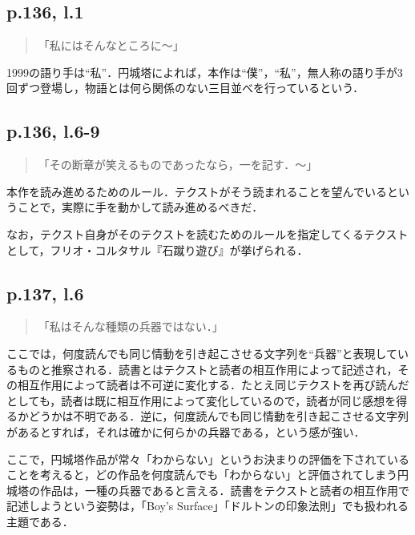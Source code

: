 \documentclass[10pt, a5paper, twoside]{ltjsarticle}
\begin{document}
        \subsection{p.136, l.1}

            \begin{quote}
                「私にはそんなところに〜」
            \end{quote}

            1999の語り手は“私”．円城塔によれば，本作は“僕”，“私”，無人称の語り手が3回ずつ登場し，物語とは何ら関係のない三目並べを行っているという\cite{sri}．

        \subsection{p.136, l.6-9}

            \begin{quote}
                「その断章が笑えるものであったなら，一を記す．〜」
            \end{quote}

            本作を読み進めるためのルール．テクストがそう読まれることを望んでいるということで，実際に手を動かして読み進めるべきだ．

            なお，テクスト自身がそのテクストを読むためのルールを指定してくるテクストとして，フリオ・コルタサル『石蹴り遊び』が挙げられる．

        \subsection{p.137, l.6}

            \begin{quote}
                「私はそんな種類の兵器ではない．」
            \end{quote}

            ここでは，何度読んでも同じ情動を引き起こさせる文字列を“兵器”と表現しているものと推察される．読書とはテクストと読者の相互作用によって記述され，その相互作用によって読者は不可逆に変化する．たとえ同じテクストを再び読んだとしても，読者は既に相互作用によって変化しているので，読者が同じ感想を得るかどうかは不明である．逆に，何度読んでも同じ情動を引き起こさせる文字列があるとすれば，それは確かに何らかの兵器である，という感が強い．

            ここで，円城塔作品が常々「わからない」というお決まりの評価を下されていることを考えると，どの作品を何度読んでも「わからない」と評価されてしまう円城塔の作品は，一種の兵器であると言える．読書をテクストと読者の相互作用で記述しようという姿勢は，「Boy's Surface」「ドルトンの印象法則」でも扱われる主題である．
\end{document}
